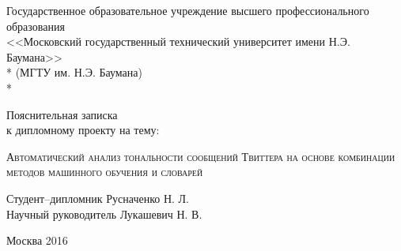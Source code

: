 \begin{titlepage}
\newpage

\begin{center}
Государственное образовательное учреждение высшего профессионального образования \\
\vspace{1cm}
\Large<<Московский государственный технический университет имени Н.Э. Баумана>> \\*
(МГТУ им. Н.Э. Баумана) \\*
\hrulefill
\end{center}


\vspace{1em}

\begin{center}
\Large Пояснительная записка \\ к дипломному проекту на тему:
\end{center}

\vspace{2.0em}

\begin{center}
	\Large
    \textsc{ Автоматический анализ тональности сообщений Твиттера на основе
        комбинации методов машинного обучения и словарей }
\end{center}

\vspace{4em}

\begin{flushleft}
Студент--дипломник \hrulefill \hspace{1pt} Русначенко Н. Л. \\
\vspace{1.5em}
Научный руководитель \hrulefill \hspace{1pt} Лукашевич Н. В.\\
\vspace{1.5em}
\end{flushleft}

\vspace{\fill}

\begin{center}
Москва 2016
\end{center}

\end{titlepage}
